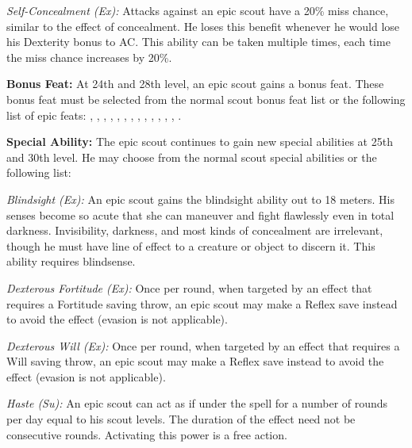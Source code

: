 \textit{Self-Concealment (Ex):} Attacks against an epic scout have a 20\% miss chance, similar to the effect of concealment. He loses this benefit whenever he would lose his Dexterity bonus to AC. This ability can be taken multiple times, each time the miss chance increases by 20\%.

\textbf{Bonus Feat:} At 24th and 28th level, an epic scout gains a bonus feat. These bonus feat must be selected from the normal scout bonus feat list or the following list of epic feats:
,
,
,
,
,
,
,
,
,
,
,
,
,
.

\textbf{Special Ability:} The epic scout continues to gain new special abilities at 25th and 30th level. He may choose from the normal scout special abilities or the following list:

\textit{Blindsight (Ex):} An epic scout gains the blindsight ability out to 18 meters. His senses become so acute that she can maneuver and fight flawlessly even in total darkness. Invisibility, darkness, and most kinds of concealment are irrelevant, though he must have line of effect to a creature or object to discern it. This ability requires blindsense.

\textit{Dexterous Fortitude (Ex):} Once per round, when targeted by an effect that requires a Fortitude saving throw, an epic scout may make a Reflex save instead to avoid the effect (evasion is not applicable).

\textit{Dexterous Will (Ex):} Once per round, when targeted by an effect that requires a Will saving throw, an epic scout may make a Reflex save instead to avoid the effect (evasion is not applicable).

\textit{Haste (Su):} An epic scout can act as if under the  spell for a number of rounds per day equal to \onefifth his scout levels. The duration of the effect need not be consecutive rounds. Activating this power is a free action.
